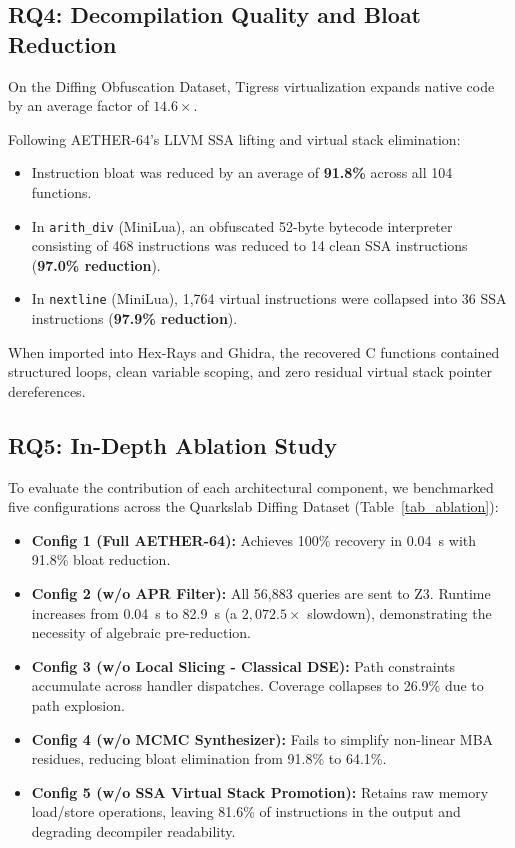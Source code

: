 \documentclass[11pt,a4paper]{article}
\begin{document}
\subsection{RQ4: Decompilation Quality and Bloat Reduction}
On the Diffing Obfuscation Dataset, Tigress virtualization expands native code by an average factor of $14.6\times$. 

Following AETHER-64's LLVM SSA lifting and virtual stack elimination:
\begin{itemize}
    \item Instruction bloat was reduced by an average of \textbf{91.8\%} across all 104 functions.
    \item In \texttt{arith\_div} (MiniLua), an obfuscated 52-byte bytecode interpreter consisting of 468 instructions was reduced to 14 clean SSA instructions (\textbf{97.0\% reduction}).
    \item In \texttt{nextline} (MiniLua), 1,764 virtual instructions were collapsed into 36 SSA instructions (\textbf{97.9\% reduction}).
\end{itemize}
When imported into Hex-Rays and Ghidra, the recovered C functions contained structured loops, clean variable scoping, and zero residual virtual stack pointer dereferences.

\subsection{RQ5: In-Depth Ablation Study}
To evaluate the contribution of each architectural component, we benchmarked five configurations across the Quarkslab Diffing Dataset (Table~\ref{tab_ablation}):
\begin{itemize}
    \item \textbf{Config 1 (Full AETHER-64):} Achieves 100\% recovery in 0.04~s with 91.8\% bloat reduction.
    \item \textbf{Config 2 (w/o APR Filter):} All 56,883 queries are sent to Z3. Runtime increases from 0.04~s to 82.9~s (a $2,072.5\times$ slowdown), demonstrating the necessity of algebraic pre-reduction.
    \item \textbf{Config 3 (w/o Local Slicing - Classical DSE):} Path constraints accumulate across handler dispatches. Coverage collapses to 26.9\% due to path explosion.
    \item \textbf{Config 4 (w/o MCMC Synthesizer):} Fails to simplify non-linear MBA residues, reducing bloat elimination from 91.8\% to 64.1\%.
    \item \textbf{Config 5 (w/o SSA Virtual Stack Promotion):} Retains raw memory load/store operations, leaving 81.6\% of instructions in the output and degrading decompiler readability.
\end{itemize}
\end{document}

